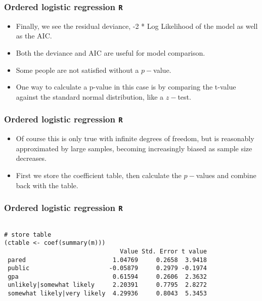 \documentclass[00-GLMregslides.tex]{subfiles}
\begin{document}
\begin{frame}[fragile]
	\frametitle{Ordered logistic regression \texttt{R} }
	\Large
\begin{itemize}
\item Finally, we see the residual deviance, -2 * Log Likelihood of the model as well as the AIC. 
\item Both the deviance and AIC are useful for model comparison.
\item Some people are not satisfied without a $p-$value.
\item One way to calculate a p-value in this case is by comparing the t-value against the standard normal distribution, like a $z-$test. 
\end{itemize}
\end{frame}
\begin{frame}[fragile]
	\frametitle{Ordered logistic regression \texttt{R} }
	\Large
\begin{itemize}
\item Of course this is only true with infinite degrees of freedom, but is reasonably approximated by large 
samples, becoming increasingly biased as sample size decreases. 
\item First we store the coefficient table, then calculate the $p-$values and combine back with the table.
\end{itemize}
\end{frame}
\begin{frame}[fragile]
	\frametitle{Ordered logistic regression \texttt{R} }
\normalsize
	
	\begin{verbatim}
		
# store table
(ctable <- coef(summary(m)))
                                Value Std. Error t value
 pared                        1.04769     0.2658  3.9418
 public                      -0.05879     0.2979 -0.1974
 gpa                          0.61594     0.2606  2.3632
 unlikely|somewhat likely     2.20391     0.7795  2.8272
 somewhat likely|very likely  4.29936     0.8043  5.3453
 
 

\end{verbatim}

\end{frame}
\end{document}
